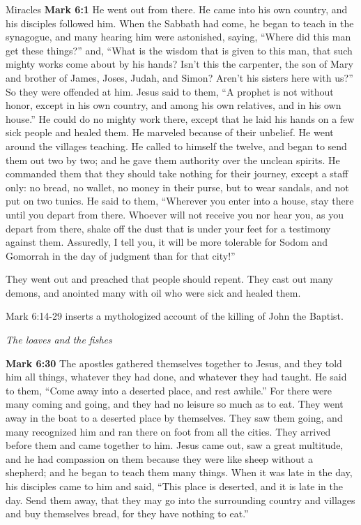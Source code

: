 \documentclass[10pt,twoside]{book}
\newcommand{\quotesize}{\normalsize{}}
\newenvironment{quotetext}{\begingroup\quotesize}{\endgroup}
\newcommand{\bible}[2]{\begin{quotetext}\textbf{#1} #2\end{quotetext}}
\newcommand{\gospelmark}[2]{\bible{Mark #1}{#2}}
\newcommand{\subhead}[1]{\emph{#1}\par}
\begin{document}
\begin{section}{Miracles}
\gospelmark{6:1}{
He went out from there. He came into his own country, and his disciples followed him.   When the Sabbath had come, he began to teach in the synagogue, and many hearing him were astonished, saying, ``Where did this man get these things?'' and, ``What is the wisdom that is given to this man, that such mighty works come about by his hands?   Isn't this the carpenter, the son of Mary and brother of James, Joses, Judah, and Simon? Aren't his sisters here with us?'' So they were offended at him.
  Jesus said to them, ``A prophet is not without honor, except in his own country, and among his own relatives, and in his own house.''   He could do no mighty work there, except that he laid his hands on a few sick people and healed them.   He marveled because of their unbelief.
He went around the villages teaching.   He called to himself the twelve, and began to send them out two by two; and he gave them authority over the unclean spirits.   He commanded them that they should take nothing for their journey, except a staff only: no bread, no wallet, no money in their purse,   but to wear sandals, and not put on two tunics.   He said to them, ``Wherever you enter into a house, stay there until you depart from there.    Whoever will not receive you nor hear you, as you depart from there, shake off the dust that is under your feet for a testimony against them. Assuredly, I tell you, it will be more tolerable for Sodom and Gomorrah in the day of judgment than for that city!'' 

They went out and preached that people should repent.   They cast out many demons, and anointed many with oil who were sick and healed them.
}

Mark 6:14-29 inserts a mythologized account of the killing of John the Baptist.

\subhead{The loaves and the fishes}

\gospelmark{6:30}{
The apostles gathered themselves together to Jesus, and they told him all things, whatever they had done, and whatever they had taught.   He said to them, ``Come away into a deserted place, and rest awhile.'' For there were many coming and going, and they had no leisure so much as to eat.   They went away in the boat to a deserted place by themselves.   They saw them going, and many recognized him and ran there on foot from all the cities. They arrived before them and came together to him.   Jesus came out, saw a great multitude, and he had compassion on them because they were like sheep without a shepherd; and he began to teach them many things.   When it was late in the day, his disciples came to him and said, ``This place is deserted, and it is late in the day.   Send them away, that they may go into the surrounding country and villages and buy themselves bread, for they have nothing to eat.''

}
\end{section}
\end{document}

